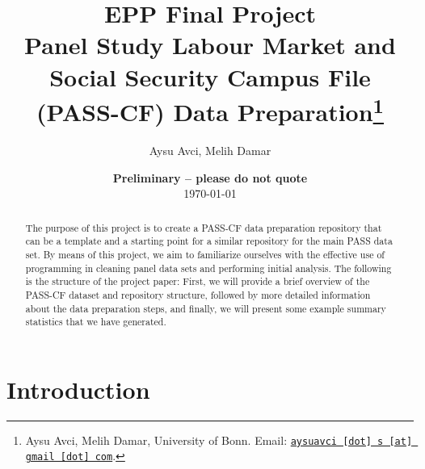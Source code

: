\documentclass[11pt, a4paper, leqno]{article}
\begin{document}
\title{%
  EPP Final Project \\
  \large Panel Study Labour Market and Social Security Campus File (PASS-CF) Data Preparation\thanks{Aysu Avci, Melih Damar, University of Bonn. Email: \href{mailto:aysuavci.s@gmail.com}{\nolinkurl{aysuavci [dot] s [at] gmail [dot] com}}.}}

\author{Aysu Avci, Melih Damar}

\date{
    {\bf Preliminary -- please do not quote}
    \\[1ex]
    \today
}

\maketitle

\begin{abstract}
    The purpose of this project is to create a PASS-CF data preparation repository that can be a template and a starting point for a similar repository for the main PASS data set. By means of this project, we aim to familiarize ourselves with the effective use of programming in cleaning panel data sets and performing initial analysis. The following is the structure of the project paper: First, we will provide a brief overview of the PASS-CF dataset and repository structure, followed by more detailed information about the data preparation steps, and finally, we will present some example summary statistics that we have generated.
\end{abstract}
\clearpage


\section{Introduction}\label{section:intro}
\end{document}
